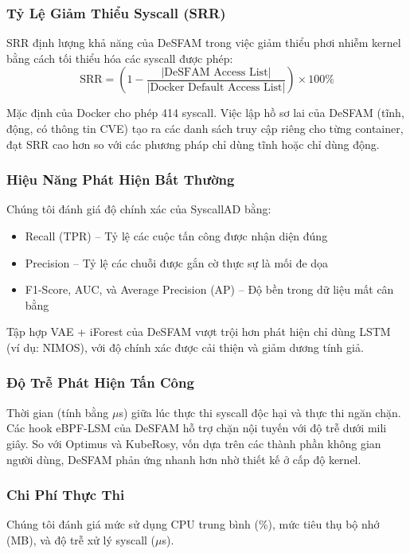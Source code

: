 \subsubsection{Tỷ Lệ Giảm Thiểu Syscall (SRR)}
SRR định lượng khả năng của DeSFAM trong việc giảm thiểu phơi nhiễm kernel bằng cách tối thiểu
hóa các syscall được phép:
\begin{equation}
  \text{SRR} = \left(1 - \frac{|\text{DeSFAM Access List}|}{|\text{Docker Default Access List}|}\right) \times 100\%
  \label{eq:srr}
\end{equation}

Mặc định của Docker cho phép 414 syscall. Việc lập hồ sơ lai của DeSFAM (tĩnh, động,
có thông tin CVE) tạo ra các danh sách truy cập riêng cho từng container, đạt SRR cao hơn so với
các phương pháp chỉ dùng tĩnh hoặc chỉ dùng động.

\subsubsection{Hiệu Năng Phát Hiện Bất Thường}
Chúng tôi đánh giá độ chính xác của SyscallAD bằng:
\begin{itemize}
  \item Recall (TPR) -- Tỷ lệ các cuộc tấn công được nhận diện đúng
  \item Precision -- Tỷ lệ các chuỗi được gắn cờ thực sự là mối đe dọa
  \item F1-Score, AUC, và Average Precision (AP) -- Độ bền trong dữ liệu mất cân bằng
\end{itemize}
Tập hợp VAE + iForest của DeSFAM vượt trội hơn phát hiện chỉ dùng LSTM (ví dụ: NIMOS), với
độ chính xác được cải thiện và giảm dương tính giả.

\subsubsection{Độ Trễ Phát Hiện Tấn Công}
Thời gian (tính bằng $\mu$s) giữa lúc thực thi syscall độc hại và thực thi ngăn chặn. Các hook
eBPF-LSM của DeSFAM hỗ trợ chặn nội tuyến với độ trễ dưới mili giây. So với Optimus và
KubeRosy, vốn dựa trên các thành phần không gian người dùng, DeSFAM phản ứng nhanh hơn nhờ
thiết kế ở cấp độ kernel.

\subsubsection{Chi Phí Thực Thi}
Chúng tôi đánh giá mức sử dụng CPU trung bình (\%), mức tiêu thụ bộ nhớ (MB), và độ trễ xử lý
syscall ($\mu$s).

